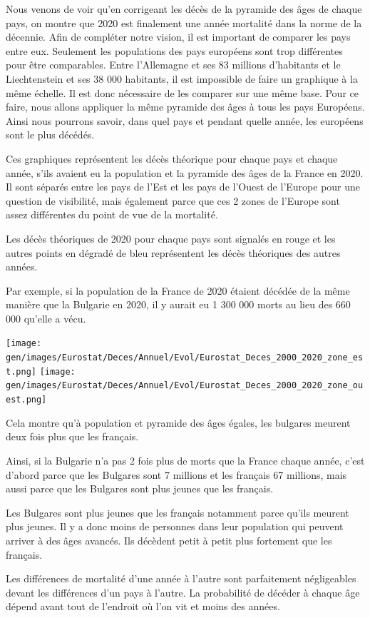 \documentclass[
]{article}
\begin{document}
Nous venons de voir qu'en corrigeant les décès de la pyramide des âges
de chaque pays, on montre que 2020 est finalement une année mortalité
dans la norme de la décennie. Afin de compléter notre vision, il est
important de comparer les pays entre eux. Seulement les populations des
pays européens sont trop différentes pour être comparables. Entre
l'Allemagne et ses 83 millions d'habitants et le Liechtenstein et ses 38
000 habitants, il est impossible de faire un graphique à la même
échelle. Il est donc nécessaire de les comparer sur une même base. Pour
ce faire, nous allons appliquer la même pyramide des âges à tous les
pays Européens. Ainsi nous pourrons savoir, dans quel pays et pendant
quelle année, les européens sont le plus décédés.

Ces graphiques représentent les décès théorique pour chaque pays et
chaque année, s'ils avaient eu la population et la pyramide des âges de
la France en 2020. Il sont séparés entre les pays de l'Est et les pays
de l'Ouest de l'Europe pour une question de visibilité, mais également
parce que ces 2 zones de l'Europe sont assez différentes du point de vue
de la mortalité.

Les décès théoriques de 2020 pour chaque pays sont signalés en rouge et
les autres points en dégradé de bleu représentent les décès théoriques
des autres années.

Par exemple, si la population de la France de 2020 étaient décédée de la
même manière que la Bulgarie en 2020, il y aurait eu 1 300 000 morts au
lieu des 660 000 qu'elle a vécu.

\texttt{[image: gen/images/Eurostat/Deces/Annuel/Evol/Eurostat\_Deces\_2000\_2020\_zone\_est.png]}
\texttt{[image: gen/images/Eurostat/Deces/Annuel/Evol/Eurostat\_Deces\_2000\_2020\_zone\_ouest.png]}

Cela montre qu'à population et pyramide des âges égales, les bulgares
meurent deux fois plus que les français.

Ainsi, si la Bulgarie n'a pas 2 fois plus de morts que la France chaque
année, c'est d'abord parce que les Bulgares sont 7 millions et les
français 67 millions, mais aussi parce que les Bulgares sont plus jeunes
que les français.

Les Bulgares sont plus jeunes que les français notamment parce qu'ils
meurent plus jeunes. Il y a donc moins de personnes dans leur population
qui peuvent arriver à des âges avancés. Ils décèdent petit à petit plus
fortement que les français.

Les différences de mortalité d'une année à l'autre sont parfaitement
négligeables devant les différences d'un pays à l'autre. La probabilité
de décéder à chaque âge dépend avant tout de l'endroit où l'on vit et
moins des années.
\end{document}
